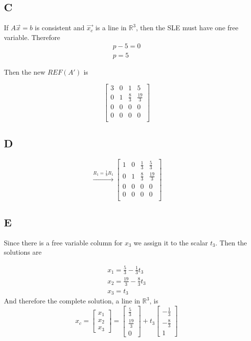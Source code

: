 \documentclass{report}
\begin{document}
\subsection*{C}

If \(A \vec{x} = b\) is consistent and \(\vec{x_c}\) is a line in $\mathbb{R}^3$, then the SLE must have one free variable. Therefore
\[
	\begin{aligned}
		p-5 = 0 \\
		p = 5
	\end{aligned}
\]

Then the new \(REF(A')\) is

\[
	\begin{bmatrix}
		3 & 0 & 1           & 5            \\
		0 & 1 & \frac{8}{3} & \frac{19}{3} \\
		0 & 0 & 0           & 0            \\
		0 & 0 & 0           & 0            \\
	\end{bmatrix}
\]

\subsection*{D}

\[
	\xrightarrow{R_1 = \frac{1}{3}R_1}
	\begin{bmatrix}
		1 & 0 & \frac{1}{3} & \frac{5}{3}  \\
		0 & 1 & \frac{8}{3} & \frac{19}{3} \\
		0 & 0 & 0           & 0            \\
		0 & 0 & 0           & 0            \\
	\end{bmatrix}
\]

\subsection*{E}

Since there is a free variable column for \(x_3\) we assign it to the scalar \(t_3\). Then the solutions are

\[
	\begin{aligned}
		x_1 =\frac{5}{3} - \frac{1}{3} t_3    \\
		x_2 =  \frac{19}{3} - \frac{8}{3} t_3 \\
		x_3 = t_3
	\end{aligned}
\]
And therefore the complete solution, a line in $\mathbb{R}^3$, is
\[
	x_c =
	\begin{bmatrix}
		x_1 \\x_2\\x_3
	\end{bmatrix}
	=
	\begin{bmatrix}
		\frac{5}{3}  \\
		\frac{19}{3} \\
		0
	\end{bmatrix}
	+ t_3
	\begin{bmatrix}
		- \frac{1}{3} \\
		- \frac{8}{3} \\
		1
	\end{bmatrix}
\]
\end{document}
